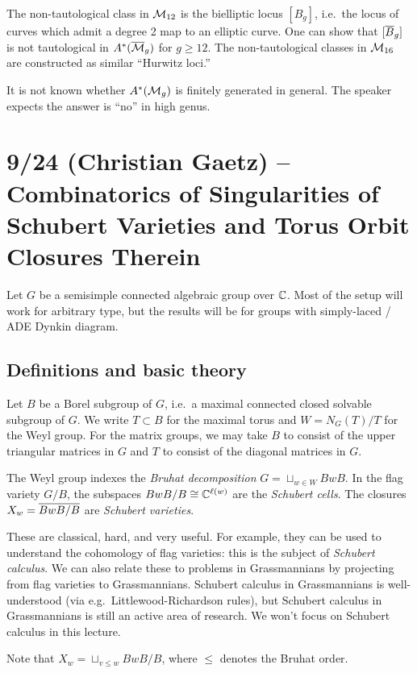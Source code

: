 \documentclass{amsart}
\begin{document}
The non-tautological class in $\mathcal{M}_{12}$ is the bielliptic locus $[B_g]$, i.e.\ the locus of curves which admit a degree 2 map to an elliptic curve.
One can show that $[\overline{B}_g]$ is not tautological in $A^*(\overline{\mathcal{M}}_g)$ for $g \geq 12$.
The non-tautological classes in $\mathcal{M}_{16}$ are constructed as similar ``Hurwitz loci.''

It is not known whether $A^*(\mathcal{M}_g)$ is finitely generated in general.
The speaker expects the answer is ``no'' in high genus.

\section{9/24 (Christian Gaetz) -- Combinatorics of Singularities of Schubert Varieties and Torus Orbit Closures Therein}

Let $G$ be a semisimple connected algebraic group over $\mathbb{C}$.
Most of the setup will work for arbitrary type, but the results will be for groups with simply-laced / ADE Dynkin diagram.

\subsection{Definitions and basic theory}

Let $B$ be a Borel subgroup of $G$, i.e.\ a maximal connected closed solvable subgroup of $G$.
We write $T \subset B$ for the maximal torus and $W = N_G(T) / T$ for the Weyl group.
For the matrix groups, we may take $B$ to consist of the upper triangular matrices in $G$ and $T$ to consist of the diagonal matrices in $G$.

The Weyl group indexes the \emph{Bruhat decomposition} $G = \sqcup_{w \in W} B w B$.
In the flag variety $G / B$, the subspaces $B w B / B \cong \mathbb{C}^{\ell(w)}$ are the \emph{Schubert cells}.
The closures $X_w = \overline{B w B / B}$ are \emph{Schubert varieties}.

These are classical, hard, and very useful.
For example, they can be used to understand the cohomology of flag varieties: this is the subject of \emph{Schubert calculus}.
We can also relate these to problems in Grassmannians by projecting from flag varieties to Grassmannians.
Schubert calculus in Grassmannians is well-understood (via e.g.\ Littlewood-Richardson rules), but Schubert calculus in Grassmannians is still an active area of research.
We won't focus on Schubert calculus in this lecture.

Note that $X_w = \sqcup_{v \leq w} B w B / B$, where $\leq$ denotes the Bruhat order.
\end{document}
